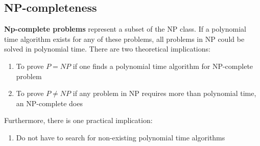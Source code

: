 \documentclass{article}
\begin{document}
\subsection{NP-completeness}
\textbf{Np-complete problems} represent a subset of the NP class. If a polynomial time algorithm exists for any of these problems, all problems in NP could be solved in polynomial time. There are two theoretical implications:
\begin{enumerate}
    \item To prove $P=NP$ if one finds a polynomial time algorithm for NP-complete problem
    \item To prove $P\neq NP$ if any problem in NP requires more than polynomial time, an NP-complete does
\end{enumerate}
Furthermore, there is one practical implication:
\begin{enumerate}
    \item Do not have to search for non-existing polynomial time algorithms
\end{enumerate}
\end{document}

